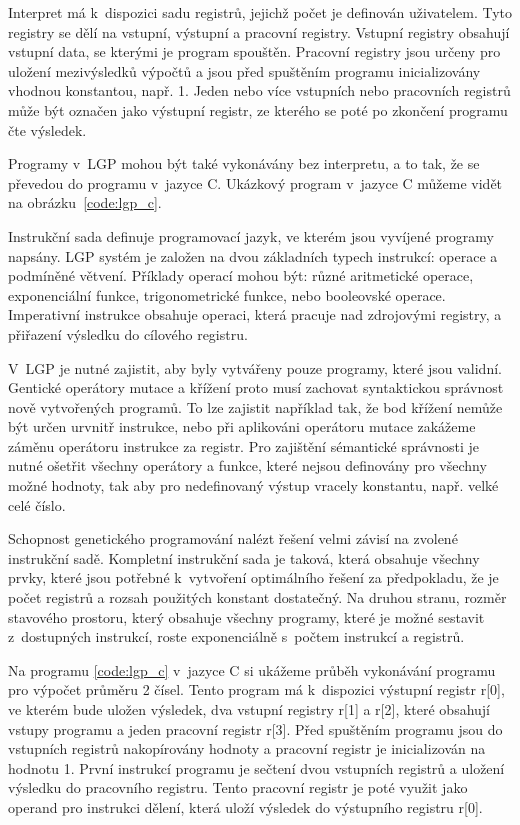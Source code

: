 Interpret má k~dispozici sadu registrů, jejichž počet je definován uživatelem.
Tyto registry se dělí na vstupní, výstupní a pracovní registry.
Vstupní registry obsahují vstupní data, se kterými je program spouštěn.
Pracovní registry jsou určeny pro uložení mezivýsledků výpočtů a jsou před spuštěním programu inicializovány vhodnou konstantou, např. 1.
Jeden nebo více vstupních nebo pracovních registrů může být označen jako výstupní registr, ze kterého se poté po zkončení programu čte výsledek.

Programy v~LGP mohou být také vykonávány bez interpretu, a to tak, že se převedou do programu v~jazyce C.
Ukázkový program v~jazyce C můžeme vidět na obrázku~\ref{code:lgp_c}.

Instrukční sada definuje programovací jazyk, ve kterém jsou vyvíjené programy napsány.
LGP systém je založen na dvou základních typech instrukcí: operace a podmíněné větvení.
Příklady operací mohou být: různé aritmetické operace, exponenciální funkce, trigonometrické funkce, nebo booleovské operace.
Imperativní instrukce obsahuje operaci, která pracuje nad zdrojovými registry, a přiřazení výsledku do cílového registru.

V~LGP je nutné zajistit, aby byly vytvářeny pouze programy, které jsou validní.
Gentické operátory mutace a křížení proto musí zachovat syntaktickou správnost nově vytvořených programů.
To lze zajistit například tak, že bod křížení nemůže být určen urvnitř instrukce, nebo při aplikováni operátoru mutace zakážeme záměnu operátoru instrukce za registr.
Pro zajištění sémantické správnosti je nutné ošetřit všechny operátory a funkce, které nejsou definovány pro všechny možné hodnoty, tak aby pro nedefinovaný výstup vracely konstantu, např. velké celé číslo.

Schopnost genetického programování nalézt řešení velmi závisí na zvolené instrukční sadě.
Kompletní instrukční sada je taková, která obsahuje všechny prvky, které jsou potřebné k~vytvoření optimálního řešení za předpokladu, že je počet registrů a rozsah použitých konstant dostatečný.
Na druhou stranu, rozměr stavového prostoru, který obsahuje všechny programy, které je možné sestavit z~dostupných instrukcí, roste exponenciálně s~počtem instrukcí a registrů.

Na programu \ref{code:lgp_c} v~jazyce C si ukážeme průběh vykonávání programu pro výpočet průměru 2 čísel.
Tento program má k~dispozici výstupní registr r[0], ve kterém bude uložen výsledek, dva vstupní registry r[1] a r[2], které obsahují vstupy programu a jeden pracovní registr r[3].
Před spuštěním programu jsou do vstupních registrů nakopírovány hodnoty a pracovní registr je inicializován na hodnotu 1.
První instrukcí programu je sečtení dvou vstupních registrů a uložení výsledku do pracovního registru.
Tento pracovní registr je poté využit jako operand pro instrukci dělení, která uloží výsledek do výstupního registru r[0].


